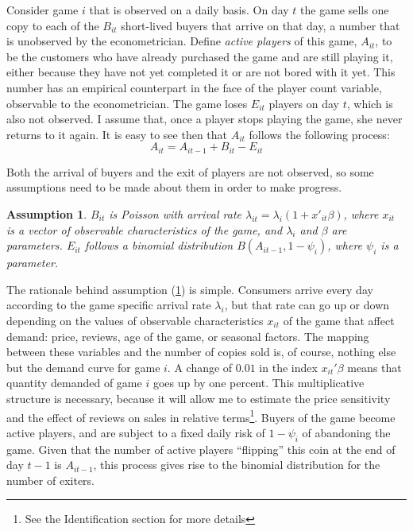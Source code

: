 \documentclass[
  12pt,
  pagebackref]{article}
\newtheorem{assumption}{Assumption}[section]
\begin{document}
Consider game \(i\) that is observed on a daily basis. On day \(t\) the
game sells one copy to each of the \(B_{it}\) short-lived buyers that
arrive on that day, a number that is unobserved by the econometrician.
Define \emph{active players} of this game, \(A_{it}\), to be the
customers who have already purchased the game and are still playing it,
either because they have not yet completed it or are not bored with it
yet. This number has an empirical counterpart in the face of the player
count variable, observable to the econometrician. The game loses
\(E_{it}\) players on day \(t\), which is also not observed. I assume
that, once a player stops playing the game, she never returns to it
again. It is easy to see then that \(A_{it}\) follows the following
process: \begin{equation}\label{activeProccess}
  A_{it} = A_{it-1} + B_{it} - E_{it}
\end{equation}

Both the arrival of buyers and the exit of players are not observed, so
some assumptions need to be made about them in order to make progress.

\begin{assumption}\label{arrivalAssumptions}
$B_{it}$ is Poisson with arrival rate $\lambda_{it} = \lambda_i(1+x'_{it}\beta)$, where $x_{it}$ is a vector of observable characteristics of the game, and $\lambda_i$ and $\beta$ are parameters. $E_{it}$ follows a binomial distribution $B(A_{it-1}, 1-\psi_i)$, where $\psi_i$ is a parameter.
\end{assumption}

The rationale behind assumption (\ref{arrivalAssumptions}) is simple.
Consumers arrive every day according to the game specific arrival rate
\(\lambda_i\), but that rate can go up or down depending on the values
of observable characteristics \(x_{it}\) of the game that affect demand:
price, reviews, age of the game, or seasonal factors. The mapping
between these variables and the number of copies sold is, of course,
nothing else but the demand curve for game \(i\). A change of \(0.01\)
in the index \(x_{it}'\beta\) means that quantity demanded of game \(i\)
goes up by one percent. This multiplicative structure is necessary,
because it will allow me to estimate the price sensitivity and the
effect of reviews on sales in relative
terms\footnote{See the Identification section for more details}. Buyers
of the game become active players, and are subject to a fixed daily risk
of \(1-\psi_i\) of abandoning the game. Given that the number of active
players ``flipping'' this coin at the end of day \(t-1\) is
\(A_{it-1}\), this process gives rise to the binomial distribution for
the number of exiters.
\end{document}
